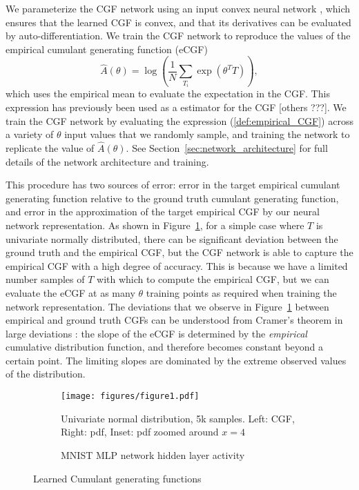 \documentclass[11pt]{article}      %
\begin{document}
We parameterize the CGF network using an input convex neural network \cite{amos_input_2017,hoedt_principled_2023}, which ensures that the learned CGF is convex, and that its derivatives can be evaluated by auto-differentiation.
We train the CGF network to reproduce the values of the empirical cumulant generating function (eCGF)
\begin{equation}
  \hat A(\theta) = \log \left( \frac{1}{N}\sum_{T_i} \exp(\theta^T T) \right), \label{def:empirical_CGF}
\end{equation}
which uses the empirical mean to evaluate the expectation in the CGF. 
This expression has previously been used as a estimator for the CGF \cite{duffield_entropy_1995} [others ???]. 
We train the CGF network by evaluating the expression (\ref{def:empirical_CGF}) across a variety of $\theta$ input values that we randomly sample, and training the network to replicate the value of $\hat A(\theta)$.
See Section~\ref{sec:network_architecture} for full details of the network architecture and training.

This procedure has two sources of error: error in the target empirical cumulant generating function relative to the ground truth cumulant generating function, and error in the approximation of the target empirical CGF by our neural network representation. 
As shown in Figure~\ref{fig:1a_CGF_Normal}, for a simple case where $T$ is univariate normally distributed, there can be significant deviation between the ground truth and the empirical CGF, but the CGF network is able to capture the empirical CGF with a high degree of accuracy.
This is because we have a limited number samples of $T$ with which to compute the empirical CGF, but we can evaluate the eCGF at as many $\theta$ training points as required when training the network representation.
The deviations that we observe in Figure~\ref{fig:1a_CGF_Normal} between empirical and ground truth CGFs can be understood from Cramer's theorem in large deviations \cite{dembo2009large}:
the slope of the eCGF is determined by the \textit{empirical} cumulative distribution function, and therefore becomes constant beyond a certain point.
The limiting slopes are dominated by the extreme observed values of the distribution.





\begin{figure}[tb]
  \centering
  \begin{subfigure}[t]{\textwidth}
    \centering
    \texttt{[image: figures/figure1.pdf]}
    \caption{Univariate normal distribution, 5k samples. Left: CGF, Right: pdf, Inset: pdf zoomed around $x=4$}
    \label{fig:1a_CGF_Normal}
  \end{subfigure}
  \begin{subfigure}[t]{\textwidth}
    \centering
    \caption{MNIST MLP network hidden layer activity}
    \label{fig:1b_CGF_MNIST}
  \end{subfigure}

  \caption{Learned Cumulant generating functions}
  \label{fig:1_CGF}
\end{figure}
\end{document}
